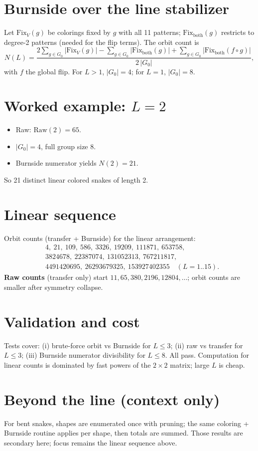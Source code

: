 \documentclass[12pt]{article}
\theoremstyle{definition}
\begin{document}
\section{Burnside over the line stabilizer}
Let \(\mathrm{Fix}_V(g)\) be colorings fixed by \(g\) with all 11 patterns; \(\mathrm{Fix}_{\text{both}}(g)\) restricts to degree-2 patterns (needed for the flip terms). The orbit count is
\[
N(L)=\frac{2\sum_{g\in G_0} |\mathrm{Fix}_V(g)|-\sum_{g\in G_0} |\mathrm{Fix}_{\text{both}}(g)|+\sum_{g\in G_0} |\mathrm{Fix}_{\text{both}}(f\circ g)|}{2\,|G_0|},
\]
with \(f\) the global flip. For \(L>1\), \(|G_0|=4\); for \(L=1\), \(|G_0|=8\).

\section{Worked example: \(L=2\)}
\begin{itemize}
    \item Raw: \(\text{Raw}(2)=65\).
    \item \(|G_0|=4\), full group size 8.
    \item Burnside numerator yields \(N(2)=21\).
\end{itemize}
So 21 distinct linear colored snakes of length 2.

\section{Linear sequence}
Orbit counts (transfer + Burnside) for the linear arrangement:
\[
\begin{aligned}
&4,\ 21,\ 109,\ 586,\ 3326,\ 19209,\ 111871,\ 653758,\\
&3824678,\ 22387074,\ 131052313,\ 767211817,\\
&4491420695,\ 26293679325,\ 153927402355\quad (L=1..15).
\end{aligned}
\]
\textbf{Raw counts} (transfer only) start \(11,65,380,2196,12804,\dots\); orbit counts are smaller after symmetry collapse.

\section{Validation and cost}
Tests cover: (i) brute-force orbit vs Burnside for \(L\le3\); (ii) raw vs transfer for \(L\le3\); (iii) Burnside numerator divisibility for \(L\le8\). All pass. Computation for linear counts is dominated by fast powers of the \(2\times2\) matrix; large \(L\) is cheap.

\section{Beyond the line (context only)}
For bent snakes, shapes are enumerated once with pruning; the same coloring + Burnside routine applies per shape, then totals are summed. Those results are secondary here; focus remains the linear sequence above.
\end{document}
